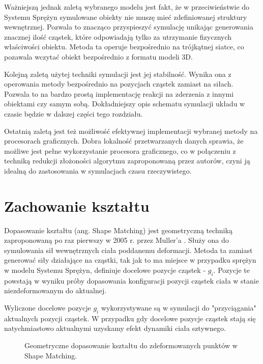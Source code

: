 Ważniejszą jednak zaletą wybranego modelu jest fakt, że w przeciwieństwie do
Systemu Sprężyn symulowane obiekty nie muszę mieć
zdefiniowanej struktury wewnętrznej. Pozwala to znacząco przyspieszyć symulację
unikając generowania znacznej ilość cząstek, które odpowiadają tylko za
utrzymanie fizycznych właściwości obiektu. Metoda ta operuje bezpośrednio na
trójkątnej siatce, co pozawala wczytać obiekt bezpośrednio z formatu modeli
3D.

Kolejną zaletą użytej techniki symulacji jest jej stabilność. Wynika ona z
operowania metody bezpośrednio na pozycjach cząstek zamiast na siłach. Pozwala
to na bardzo prostą implementację reakcji na zderzenia z innymi obiektami czy
samym sobą. Dokładniejszy opis schematu symulacji układu w czasie będzie w
dalszej części tego rozdziału.

Ostatnią zaletą jest też możliwość efektywnej implementacji wybranej metody na
procesorach graficznych. Dobra lokalność przetwarzanych danych sprawia, że
możliwe jest pełne wykorzystanie procesora graficznego, co w połączeniu z
techniką redukcji złożoności algorytmu zaproponowaną przez autorów, czyni ją
idealną do zastosowania w symulacjach czasu rzeczywistego.

\section{Zachowanie kształtu}
Dopasowanie kształtu (ang. Shape Matching) jest geometryczną techniką
zaproponowaną po raz pierwszy w 2005 r. przez Muller'a \cite{shape}. Służy ona do
symulowania sił wewnętrznych ciała poddanemu deformacji. Metoda ta zamiast
generować siły działające na cząstki, tak jak to ma miejsce w przypadku
sprężyn w modelu Systemu Sprężyn, definiuje docelowe pozycje cząstek - $g_i$.
Pozycje te powstają w wyniku próby dopasowania konfiguracji 
pozycji cząstek ciała w stanie niezdeformowanym do aktualnej.

Wyliczone docelowe pozycje $g_i$ wykorzystywane są w symulacji do "przyciągania"
aktualnych pozycji cząstek. W przypadku gdy docelowe pozycje cząstek stają się
natychmiastowo aktualnymi uzyskamy efekt dynamiki ciała sztywnego.

\begin{figure}[ht]
\centering

\caption{Geometryczne dopasowanie kształtu do zdeformowanych punktów w Shape Matching.}
\label{shape-matching}
\end{figure}

